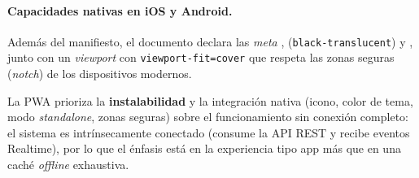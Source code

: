 \paragraph{Capacidades nativas en iOS y Android.} Además del manifiesto, el documento
 declara las \textit{meta} ,
 (\texttt{black-translucent}) y
, junto con un \textit{viewport} con \texttt{viewport-fit=cover}
que respeta las zonas seguras (\textit{notch}) de los dispositivos modernos.

\begin{AvisoNota}
La PWA prioriza la \textbf{instalabilidad} y la integración nativa (icono, color de tema,
modo \textit{standalone}, zonas seguras) sobre el funcionamiento sin conexión completo:
el sistema es intrínsecamente conectado (consume la API REST y recibe eventos Realtime),
por lo que el énfasis está en la experiencia tipo app más que en una caché \textit{offline}
exhaustiva.
\end{AvisoNota}
